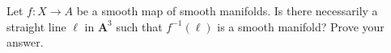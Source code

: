 Let $f:X\rightarrow A$ be a smooth map of smooth manifolds. Is there
necessarily a straight line $\ell$ in $\mathbf{A}^3$ such that
$f^{-1}(\ell)$ is a smooth manifold? Prove your answer.
